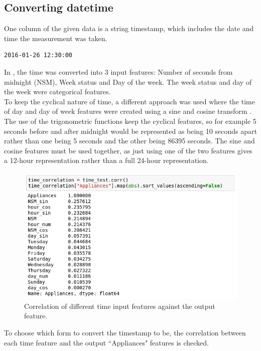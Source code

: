 \documentclass{article}
\newcommand{\n}[0]{\\[\baselineskip]}
\begin{document}
\subsection{Converting datetime}
One column of the given data is a string timestamp, which includes the date and time the measurement was taken. 
\begin{lstlisting}[caption={Example timestamp snippet}, backgroundcolor = \color{lightgray}]
2016-01-26 12:30:00
\end{lstlisting}
In \cite{paper}, the time was converted into 3 input features: Number of seconds from midnight (NSM), Week status and Day of the week. The week status and day of the week were categorical features.
\n
To keep the cyclical nature of time, a different approach was used where the time of day and day of week features were created using a sine and cosine transform \cite{cyclic}. The use of the trigonometric functions keep the cyclical features, so for example 5 seconds before and after midnight would be represented as being 10 seconds apart rather than one being 5 seconds and the other being 86395 seconds. The sine and cosine features must be used together, as just using one of the two features gives a 12-hour representation rather than a full 24-hour representation. 

\begin{figure}[H]
\centering
\includegraphics[width=1\textwidth, keepaspectratio]{imgs/time-correlation.png}
\caption{Correlation of different time input features against the output feature.}
\end{figure}
\noindent
To choose which form to convert the timestamp to be, the correlation between each time feature and the output ``Appliances" features is checked. 
\end{document}
